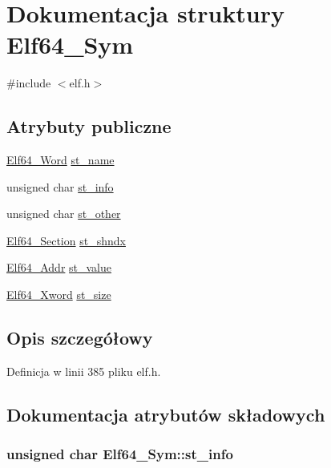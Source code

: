 \hypertarget{struct_elf64___sym}{\section{Dokumentacja struktury Elf64\-\_\-\-Sym}
\label{struct_elf64___sym}
}


{\ttfamily \#include $<$elf.\-h$>$}

\subsection*{Atrybuty publiczne}
\begin{DoxyCompactItemize}
\item 
\hyperlink{elf_8h_aa3aa1920ed115b7ef7e99716fece4401}{Elf64\-\_\-\-Word} \hyperlink{struct_elf64___sym_a4069f9db0c91ecc40bc2f4ddbdf28aff}{st\-\_\-name}
\item 
unsigned char \hyperlink{struct_elf64___sym_a9bbd53b13b0f1403d8369cbdd15df08c}{st\-\_\-info}
\item 
unsigned char \hyperlink{struct_elf64___sym_adba66dcdbe19ab3ecc24830a58549230}{st\-\_\-other}
\item 
\hyperlink{elf_8h_acc3d34d4258f3cf91184ff97a6f8dda1}{Elf64\-\_\-\-Section} \hyperlink{struct_elf64___sym_a942ca56d5692e290b23366388fc600e6}{st\-\_\-shndx}
\item 
\hyperlink{elf_8h_aeed51d08e3a950d637f8ec1f0cd4ef65}{Elf64\-\_\-\-Addr} \hyperlink{struct_elf64___sym_a9601295da4c2e81cc18c1f777609e1bf}{st\-\_\-value}
\item 
\hyperlink{elf_8h_a5447a48a3dae0bd24f606415268c6fe4}{Elf64\-\_\-\-Xword} \hyperlink{struct_elf64___sym_af5c72e0a09802b81e8087b303ec4d29f}{st\-\_\-size}
\end{DoxyCompactItemize}


\subsection{Opis szczegółowy}


Definicja w linii 385 pliku elf.\-h.



\subsection{Dokumentacja atrybutów składowych}
\hypertarget{struct_elf64___sym_a9bbd53b13b0f1403d8369cbdd15df08c}{
\subsubsection[{st\-\_\-info}]{\setlength{\rightskip}{0pt plus 5cm}unsigned char Elf64\-\_\-\-Sym\-::st\-\_\-info}}\label{struct_elf64___sym_a9bbd53b13b0f1403d8369cbdd15df08c}


